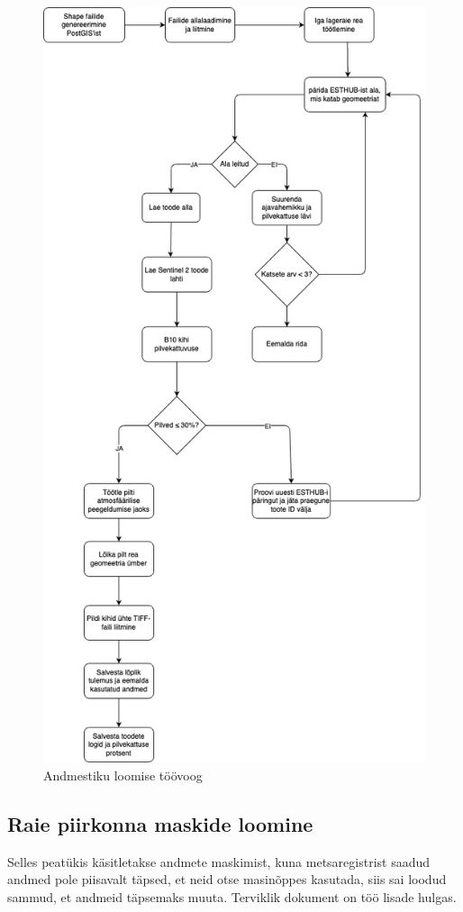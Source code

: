 \begin{figure}[H]
    \centering
    \includegraphics[width=.8\textwidth]{figures/andmestik/andmete_voog.drawio.png}
    \caption{Andmestiku loomise töövoog}
    \label{fig:terveflow}
\end{figure}


\subsection{Raie piirkonna maskide loomine}
Selles peatükis käsitletakse andmete maskimist, kuna metsaregistrist saadud andmed pole piisavalt täpsed, et neid otse masinõppes kasutada, siis sai loodud sammud, et andmeid täpsemaks muuta. Terviklik dokument on töö lisade hulgas.

